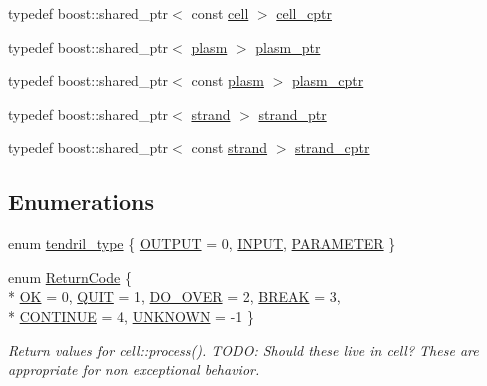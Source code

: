 \begin{DoxyCompactItemize}
\item 
typedef boost\+::shared\+\_\+ptr$<$ const \hyperlink{structecto_1_1cell}{cell} $>$ \hyperlink{namespaceecto_ab708c826226c91fd6f3c8c121f293a78}{cell\+\_\+cptr}
\item 
typedef boost\+::shared\+\_\+ptr$<$ \hyperlink{structecto_1_1plasm}{plasm} $>$ \hyperlink{namespaceecto_a6b83be6cd685db71f03b14871653475f}{plasm\+\_\+ptr}
\item 
typedef boost\+::shared\+\_\+ptr$<$ const \hyperlink{structecto_1_1plasm}{plasm} $>$ \hyperlink{namespaceecto_a5a9973f00c94e30353acb27c3d2fa836}{plasm\+\_\+cptr}
\item 
typedef boost\+::shared\+\_\+ptr$<$ \hyperlink{structecto_1_1strand}{strand} $>$ \hyperlink{namespaceecto_a98ca3b7b690de778292922c806e7588d}{strand\+\_\+ptr}
\item 
typedef boost\+::shared\+\_\+ptr$<$ const \hyperlink{structecto_1_1strand}{strand} $>$ \hyperlink{namespaceecto_abbad20d834739bbf762269e4e04a6732}{strand\+\_\+cptr}
\end{DoxyCompactItemize}
\subsection*{Enumerations}
\begin{DoxyCompactItemize}
\item 
enum \hyperlink{namespaceecto_a02939764b22968505f82e425c83272c2}{tendril\+\_\+type} \{ \hyperlink{namespaceecto_a02939764b22968505f82e425c83272c2a2a607ed53342989a455e71bf3a78cb08}{O\+U\+T\+P\+UT} = 0, 
\hyperlink{namespaceecto_a02939764b22968505f82e425c83272c2adf3175f3e2ad3637b6fca943b4cc7672}{I\+N\+P\+UT}, 
\hyperlink{namespaceecto_a02939764b22968505f82e425c83272c2a39346743c7a624185996a561642a9aaa}{P\+A\+R\+A\+M\+E\+T\+ER}
 \}
\item 
enum \hyperlink{namespaceecto_a93d82cd28db695d53963fb696582762c}{Return\+Code} \{ \\*
\hyperlink{namespaceecto_a93d82cd28db695d53963fb696582762ca047df8448e71f9fc10f4fe310b0a4de7}{OK} = 0, 
\hyperlink{namespaceecto_a93d82cd28db695d53963fb696582762ca6803dad912ff60afb751d630ba35f0b3}{Q\+U\+IT} = 1, 
\hyperlink{namespaceecto_a93d82cd28db695d53963fb696582762caa83c6c7678d27bc12006c6343229f841}{D\+O\+\_\+\+O\+V\+ER} = 2, 
\hyperlink{namespaceecto_a93d82cd28db695d53963fb696582762cab1a50eb818462b09d2aeed53db036ede}{B\+R\+E\+AK} = 3, 
\\*
\hyperlink{namespaceecto_a93d82cd28db695d53963fb696582762caa00c877a06d58c100c7b0788c6c38b0a}{C\+O\+N\+T\+I\+N\+UE} = 4, 
\hyperlink{namespaceecto_a93d82cd28db695d53963fb696582762caed3dfd705e16962aacd0ba04103fa6cc}{U\+N\+K\+N\+O\+WN} = -\/1
 \}\begin{DoxyCompactList}\small\item\em Return values for cell\+::process(). T\+O\+DO\+: Should these live in cell? These are appropriate for non exceptional behavior. \end{DoxyCompactList}
\end{DoxyCompactItemize}
